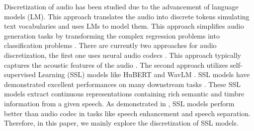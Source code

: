 \documentclass[conference]{IEEEtran}
\begin{document}
Discretization of audio has been studied due to the advancement of language models (LM). 
This approach translates the audio into discrete tokens simulating text vocabularies and uses LMs to 
model them. This approach simplifies audio generation tasks by transforming the complex 
regression problems into classification problems \cite{dasb}. There are currently two approaches for
audio discretization, the first one uses neural audio codecs \cite{dac}. This approach 
typically captures the acoustic features of the audio \cite{speech_tokenizer}. The second approach 
utilizes  self-supervised Learning (SSL) models like HuBERT \cite{hubert} and WavLM \cite{wavlm}.
SSL models have demonstrated 
excellent performances on many downstream tasks \cite{superb}. These SSL models extract  
continuous representations containing rich semantic and timbre information from a given speech. 
As demonstrated in \cite{dasb}, SSL models perform better than audio codec in tasks like speech 
enhancement and speech separation. Therefore, in this 
paper, we mainly explore the discretization of SSL models.  
\end{document}

